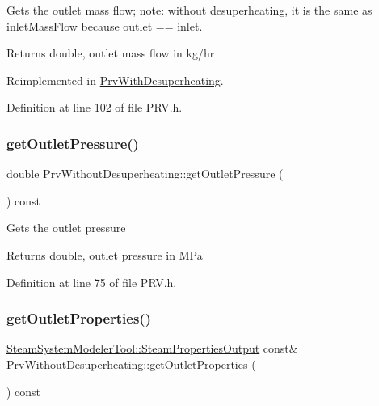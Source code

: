 Gets the outlet mass flow; note\+: without desuperheating, it is the same as inlet\+Mass\+Flow because outlet == inlet. \begin{DoxyReturn}{Returns}
double, outlet mass flow in kg/hr 
\end{DoxyReturn}


Reimplemented in \hyperlink{class_prv_with_desuperheating_a848a898a392dd7abfb030d0ca1653454}{Prv\+With\+Desuperheating}.



Definition at line 102 of file P\+R\+V.\+h.

\mbox{\label{class_prv_without_desuperheating_ae1d335703442deec2f2c2f93e4c862f2}} 
\subsubsection{\texorpdfstring{get\+Outlet\+Pressure()}{getOutletPressure()}}
{\footnotesize\ttfamily double Prv\+Without\+Desuperheating\+::get\+Outlet\+Pressure (\begin{DoxyParamCaption}{ }\end{DoxyParamCaption}) const\hspace{0.3cm}{\ttfamily [inline]}}

Gets the outlet pressure

\begin{DoxyReturn}{Returns}
double, outlet pressure in M\+Pa 
\end{DoxyReturn}


Definition at line 75 of file P\+R\+V.\+h.

\mbox{\label{class_prv_without_desuperheating_afcf1f5d7e6b18643ac8adc9023578147}} 
\subsubsection{\texorpdfstring{get\+Outlet\+Properties()}{getOutletProperties()}}
{\footnotesize\ttfamily \hyperlink{struct_steam_system_modeler_tool_1_1_steam_properties_output}{Steam\+System\+Modeler\+Tool\+::\+Steam\+Properties\+Output} const\& Prv\+Without\+Desuperheating\+::get\+Outlet\+Properties (\begin{DoxyParamCaption}{ }\end{DoxyParamCaption}) const\hspace{0.3cm}{\ttfamily [inline]}}

